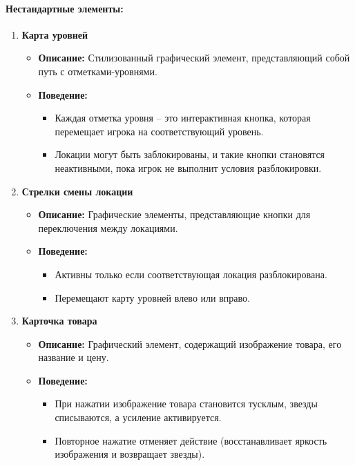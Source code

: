 \documentclass{article}
\begin{document}
\paragraph{Нестандартные элементы:}
\begin{enumerate}
    \item \textbf{Карта уровней}
    \begin{itemize}
        \item \textbf{Описание:} Стилизованный графический элемент, представляющий собой путь с отметками-уровнями.
        \item \textbf{Поведение:}
        \begin{itemize}
            \item Каждая отметка уровня – это интерактивная кнопка, которая перемещает игрока на соответствующий уровень.
            \item Локации могут быть заблокированы, и такие кнопки становятся неактивными, пока игрок не выполнит условия разблокировки.
        \end{itemize}
    \end{itemize}

    \item \textbf{Стрелки смены локации}
    \begin{itemize}
        \item \textbf{Описание:} Графические элементы, представляющие кнопки для переключения между локациями.
        \item \textbf{Поведение:}
        \begin{itemize}
            \item Активны только если соответствующая локация разблокирована.
            \item Перемещают карту уровней влево или вправо.
        \end{itemize}
    \end{itemize}

    \item \textbf{Карточка товара}
    \begin{itemize}
        \item \textbf{Описание:} Графический элемент, содержащий изображение товара, его название и цену.
        \item \textbf{Поведение:}
        \begin{itemize}
            \item При нажатии изображение товара становится тусклым, звезды списываются, а усиление активируется.
            \item Повторное нажатие отменяет действие (восстанавливает яркость изображения и возвращает звезды).
        \end{itemize}
    \end{itemize}


\end{enumerate}
\end{document}
